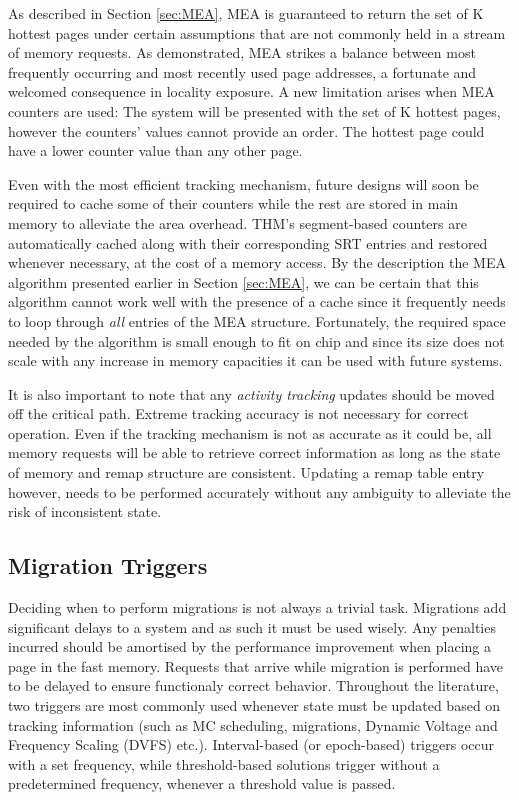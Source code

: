 As described in Section \ref{sec:MEA}, MEA is guaranteed to return the set of K hottest pages under certain assumptions that are not commonly held in a stream of memory requests. As demonstrated, MEA strikes a balance between most frequently occurring and most recently used page addresses, a fortunate and welcomed consequence in locality exposure. A new limitation arises when MEA counters are used: The system will be presented with the set of K hottest pages, however the counters' values cannot provide an order. The hottest page could have a lower counter value than any other page.

Even with the most efficient tracking mechanism, future designs will soon be required to cache some of their counters while the rest are stored in main memory to alleviate the area overhead. THM's segment-based counters are automatically cached along with their corresponding SRT entries and restored whenever necessary, at the cost of a memory access. By the description the MEA algorithm presented earlier in Section \ref{sec:MEA}, we can be certain that this algorithm cannot work well with the presence of a cache since it frequently needs to loop through \textit{all} entries of the MEA structure. Fortunately, the required space needed by the algorithm is small enough to fit on chip and since its size does not scale with any increase in memory capacities it can be used with future systems.

It is also important to note that any \textit{activity tracking} updates should be moved off the critical path. Extreme tracking accuracy is not necessary for correct operation. Even if the tracking mechanism is not as accurate as it could be, all memory requests will be able to retrieve correct information as long as the state of memory and remap structure are consistent. Updating a remap table entry however, needs to be performed accurately without any ambiguity to alleviate the risk of inconsistent state.

\subsection{Migration Triggers}
Deciding when to perform migrations is not always a trivial task. Migrations add significant delays to a system and as such it must be used wisely. Any penalties incurred should be amortised by the performance improvement when placing a page in the fast memory. Requests that arrive while migration is performed have to be delayed to ensure functionaly correct behavior. Throughout the literature, two triggers are most commonly used whenever state must be updated based on tracking information (such as MC scheduling, migrations, Dynamic Voltage and Frequency Scaling (DVFS) etc.). Interval-based (or epoch-based) triggers occur with a set frequency, while threshold-based solutions trigger without a predetermined frequency, whenever a threshold value is passed. 


